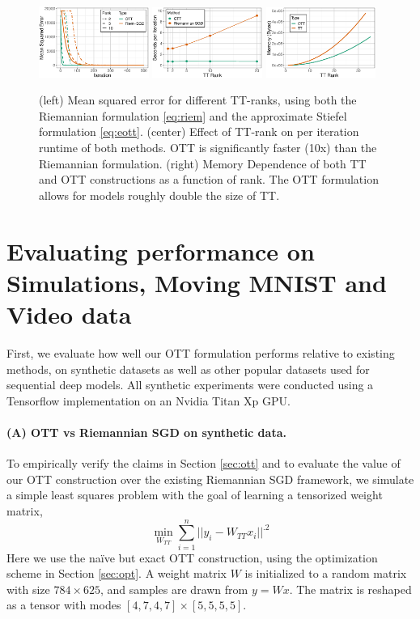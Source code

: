 \begin{figure}
	\centering
	\includegraphics[width=0.32\textwidth]{4_ott/figs/sim/rank_convergence.eps}
	\includegraphics[width=0.32\textwidth]{4_ott/figs/sim/time_comparison.eps}
    \includegraphics[width=0.32\textwidth]{4_ott/figs/sim/mem_vs_rank.eps}
	\caption[Orthogonal tensor trains compared to Riemannian TT approaches]{\label{fig:riemstief} (left) Mean squared error for different TT-ranks,
          using both the Riemannian formulation \eqref{eq:riem} and the approximate Stiefel formulation \eqref{eq:eott}.
          (center) Effect of TT-rank on per iteration runtime of both methods. OTT is significantly faster (10x)
          than the Riemannian formulation.
          (right) Memory Dependence of both TT and OTT constructions as a function of rank.
          The OTT formulation allows for models roughly double the size of TT.}
\end{figure}

\section{Evaluating performance on Simulations, Moving MNIST and Video data}\label{sec:exps}
First,
we evaluate how well our OTT formulation performs relative to existing methods, on synthetic
datasets as well as other popular datasets used for sequential deep models. 
All synthetic experiments were conducted using a Tensorflow implementation on
an Nvidia Titan Xp GPU. 

\paragraph{(A) OTT vs Riemannian SGD on synthetic data.}
To empirically verify the claims in Section \ref{sec:ott}
and to evaluate the value of our OTT construction over the existing Riemannian SGD framework,
we simulate a simple least squares problem with the goal of learning a tensorized weight matrix,
$$\min_{W_{TT}} \sum_{i=1}^n ||y_i - W_{TT}x_i||^.2$$
Here we use the na\"ive but exact OTT construction,
using the optimization scheme in Section \ref{sec:opt}.
A weight matrix $W$ is initialized to a random matrix with size $784 \times 625$, and samples are drawn from $y=Wx$. The matrix is reshaped as a tensor with modes $[4,7,4,7] \times [5,5,5,5]$.


